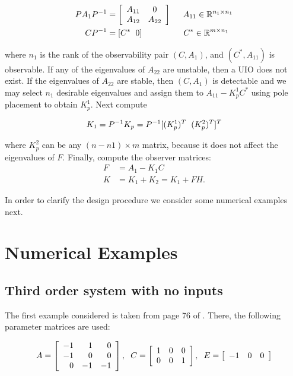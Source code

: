 \documentclass{amsart}
\theoremstyle{definition}
\theoremstyle{remark}
\numberwithin{equation}{section}
\begin{document}
\begin{align*}
PA_1P^{-1} &= 
\left [ \begin{array}{cc} 
A_{11} & 0 \\ 
A_{12} & A_{22} 
\end{array} \right ] \hspace{5mm} A_{11} \in \mathbb{R}^{n_1 \times n_1} \\
CP^{-1} &= \left [ C^* \hspace{2mm} 0 \right ] \hspace{17mm} C^* \in \mathbb{R}^{m \times n_1}
\end{align*}

where $n_1$ is the rank of the observability pair $(C,A_1)$, and $(C^*, A_{11})$ is observable. If any of the eigenvalues of $A_{22}$ are unstable, then a UIO does not exist. If the eigenvalues of $A_{22}$ are stable, then $(C, A_1)$ is detectable and we may select $n_1$ desirable eigenvalues and assign them to $A_{11} - K_p^1 C^*$ using pole placement to obtain $K_p^1$. Next compute 

\begin{align*}
K_1 = P^{-1}K_p = P^{-1}[(K_p^1)^T \hspace{2mm} (K_p^2)^T]^T
\end{align*} 

where $K_p^2$ can be any $(n-n1) \times m$ matrix, because it does not affect the eigenvalues of $F$. Finally, compute the observer matrices:
\begin{align*}
F &= A_1 - K_1 C \\ 
K &= K_1 + K_2 = K_1 + FH.
\end{align*}

In order to clarify the design procedure we consider some numerical examples next.
\section{Numerical Examples} 
\subsection{Third order system with no inputs}\label{ex:ex1}
The first example considered is taken from page 76 of \cite{Chen99}. There, the following parameter matrices are used: 

\begin{equation}
\begin{aligned}
A = \displaystyle \left [ \begin{array}{rrr}
-1 & 1 & 0 \\
-1 & 0 & 0 \\
 0 & -1 & -1
 \end{array} \right ], \hspace{2mm} C = \displaystyle \left [ \begin{array}{rrr} 1 & 0 & 0 \\ 0 & 0 & 1 \end{array} \right ], \hspace{2mm} E = \displaystyle \left [ \begin{array}{rrr} -1 & 0 & 0 \end{array} \right ]
\end{aligned}
\end{equation}
\end{document}
